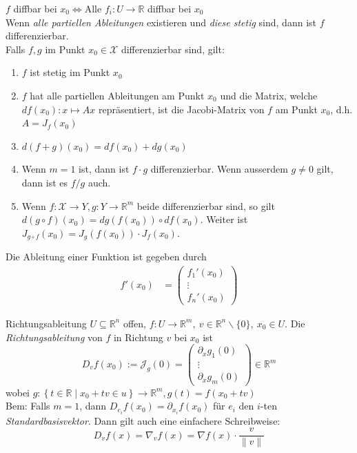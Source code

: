 \documentclass[a4paper,10pt]{article}
\def\R{\mathbb{R}}
\def\X{\mathcal{X}}
\begin{document}
\noindent $f$ diffbar bei $x_{0} \iff$Alle $f_{i}: U \to \mathbb{R}$ diffbar bei $x_{0}$ \\
Wenn \textit{alle partiellen Ableitungen} existieren und \textit{diese stetig} sind, dann ist $f$ differenzierbar.\\
Falls $f,g$ im Punkt $x_0 \in \X$ differenzierbar sind, gilt:
\begin{enumerate}
    \item $f$ ist stetig im Punkt $x_0$
    \item $f$ hat alle partiellen Ableitungen am Punkt $x_0$ und die Matrix, welche $df(x_0): x \mapsto Ax$ repräsentiert, ist die Jacobi-Matrix von $f$ am Punkt $x_0$, d.h. $A = J_f(x_0)$
    \item $d(f+g)(x_0) = df(x_0) + dg(x_0)$
    \item Wenn $m = 1$ ist, dann ist $f\cdot g$ differenzierbar. Wenn ausserdem $g \ne 0$ gilt, dann ist es $f/g$ auch.
    \item Wenn $f: \X \to Y, g: Y \to \R^m$ beide differenzierbar sind, so gilt $d(g \circ f)(x_0) = dg(f(x_0)) \circ df(x_0)$. 
            Weiter ist $J_{g \circ f}(x_0) = J_g(f(x_0)) \cdot J_f(x_0)$.
\end{enumerate}
Die Ableitung einer Funktion ist gegeben durch
\begin{align*}
    f'(x_0) & = \begin{pmatrix} 
    f_1'(x_0)\\
    \vdots\\
    f_n'(x_0)
    \end{pmatrix}
\end{align*}
\begin{mainbox}{Richtungsableitung}
	$U \subseteq \mathbb{R}^n$ offen, $f: U\rightarrow \mathbb{R}^m,\ v \in \mathbb{R}^n \backslash\{0\},\ x_0 \in U$.
Die \textit{Richtungsableitung} von $f$ in Richtung $v$ bei $x_0$ ist 
$$D_v f\left(x_0\right):=\mathcal{J}_g(0)=\left(\begin{array}{c}\partial_{x} g_1(0) \\ \vdots \\ \partial_{x} g_m(0)\end{array}\right)  \in \mathbb{R}^m$$
wobei $g:\left\{t \in \mathbb{R} \mid x_0+t v \in u\right\} \rightarrow \mathbb{R}^m,g(t)=f\left(x_0+t v\right)$\\
Bem: Falls $m=1$, dann $D_{e_i} f\left(x_0\right)=\partial_{x_i} f\left(x_0\right)$ für $e_i$ den $i$-ten \textit{Standardbasisvektor}.
Dann gilt auch eine einfachere Schreibweise:
$$D_{v} f(x)=\nabla_{v} f(x)=\nabla f(x) \cdot \frac{v}{\|v\|}$$
\end{mainbox}
\end{document}
